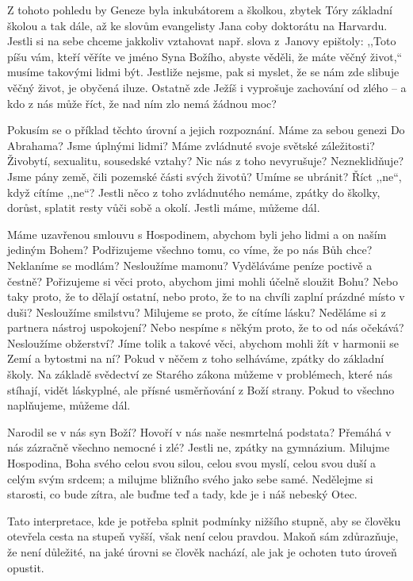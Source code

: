 Z tohoto pohledu by Geneze byla inkubátorem a školkou, zbytek Tóry základní
školou a tak dále, až ke slovům evangelisty Jana coby doktorátu na Harvardu.
Jestli si na sebe chceme jakkoliv vztahovat např. slova z~Janovy epištoly:
,,Toto píšu vám, kteří věříte ve jméno Syna Božího, abyste věděli, že máte věčný
život,`` musíme takovými lidmi být. Jestliže nejsme, pak si myslet, že se nám
zde slibuje věčný život, je obyčená iluze. Ostatně zde Ježíš i vyprošuje
zachování od zlého -- a kdo z nás může říct, že nad ním zlo nemá žádnou moc?

Pokusím se o příklad těchto úrovní a jejich rozpoznání. Máme za sebou genezi Do
Abrahama? Jsme úplnými lidmi? Máme zvládnuté svoje světské záležitosti?
Živobytí, sexualitu, sousedské vztahy? Nic nás z toho nevyrušuje? Nezneklidňuje?
Jsme pány země, čili pozemské části svých životů? Umíme se ubránit? Říct ,,ne``,
když cítíme ,,ne``? Jestli něco z toho zvládnutého nemáme, zpátky do školky,
dorůst, splatit resty vůči sobě a okolí. Jestli máme, můžeme dál.

Máme uzavřenou smlouvu s Hospodinem, abychom byli jeho lidmi a on naším jediným
Bohem? Podřizujeme všechno tomu, co víme, že po nás Bůh chce? Neklaníme se
modlám?
Nesloužíme mamonu? Vyděláváme peníze poctivě a čestně? Pořizujeme si věci proto,
abychom jimi mohli účelně sloužit Bohu? Nebo taky proto, že to dělají ostatní,
nebo proto, že to na chvíli zaplní prázdné místo v duši?
Nesloužíme smilstvu? Milujeme se proto, že cítíme lásku? Neděláme si z partnera
nástroj uspokojení? Nebo nespíme s někým proto, že to od nás očekává?
Nesloužíme obžerství? Jíme tolik a takové věci, abychom mohli žít v harmonii se
Zemí a bytostmi na ní?
Pokud v něčem z toho selháváme, zpátky do základní školy. Na základě svědectví
ze Starého zákona můžeme v problémech, které nás stíhají, vidět láskyplné, ale
přísné usměrňování z Boží strany. Pokud to všechno naplňujeme, můžeme dál.

Narodil se v nás syn Boží? Hovoří v nás naše nesmrtelná podstata? Přemáhá v nás
zázračně všechno nemocné i zlé?
Jestli ne, zpátky na gymnázium. Milujme Hospodina, Boha svého celou svou silou,
celou svou myslí, celou svou duší a celým svým srdcem; a milujme bližního svého
jako sebe samé. Nedělejme si starosti, co bude zítra, ale buďme teď a tady, kde
je i náš nebeský Otec.

Tato interpretace, kde je potřeba splnit podmínky nižšího stupně, aby se člověku
otevřela cesta na stupeň vyšší, však není celou pravdou. Makoň sám zdůrazňuje,
že není důležité, na jaké úrovni se člověk nachází, ale jak je ochoten tuto
úroveň opustit.

